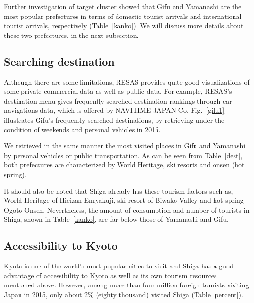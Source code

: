 \documentclass[10pt, conference, compsocconf]{IEEEtran}
\begin{document}
Further investigation of target cluster showed that Gifu and Yamanashi are the most popular  prefectures in terms of domestic tourist arrivals and international tourist arrivals, respectively (Table~\ref{kanko}).
We will discuss more details about these two prefectures, in the next subsection.


\subsection{Searching destination}

Although there are some limitations, RESAS provides quite good visualizations of some private commercial data as well as public data. For example, RESAS's destination menu gives frequently searched destination rankings through car navigations data, which is offered by NAVITIME JAPAN Co. Fig.~\ref{gifu1} illustrates Gifu's frequently searched destinations, by retrieving under the condition of weekends and personal vehicles in 2015. 


We retrieved in the same manner the most visited places in Gifu and Yamanashi by personal vehicles or public transportation.
As can be seen from Table~\ref{dest}, 
both prefectures are characterized by World Heritage, ski resorts and onsen (hot spring). 

It should also be noted that Shiga already has these tourism factors such as, 
World Heritage of Hieizan Enryakuji, ski resort of Biwako Valley and hot spring Ogoto Onsen.
Nevertheless, the amount of consumption and number of tourists in Shiga, shown in Table~\ref{kanko}, are far below those of Yamanashi and Gifu.


\subsection{Accessibility to Kyoto}


Kyoto is one of the world's most popular cities to visit and Shiga has a good advantage of accessibility to Kyoto as well as its own tourism resources mentioned above.
However, among more than four million foreign tourists visiting Japan in 2015, only about 2\% (eighty thousand) visited Shiga (Table \ref{percent}).
\end{document}
